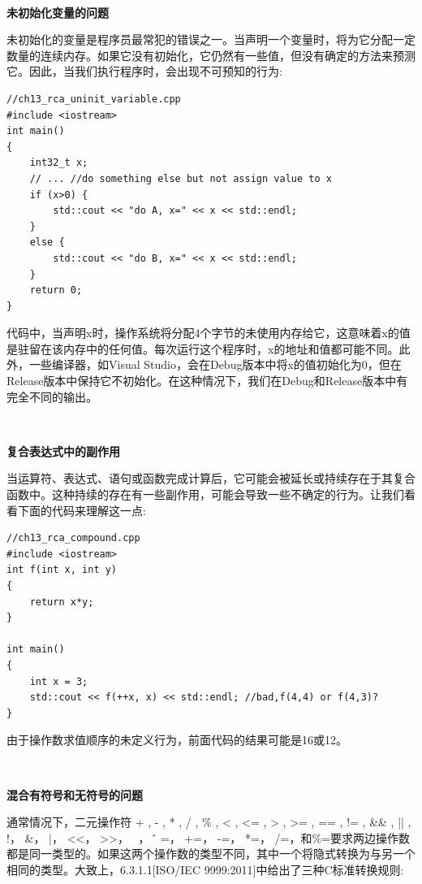 \noindent\textbf{}\ \par
\textbf{未初始化变量的问题} \ \par
未初始化的变量是程序员最常犯的错误之一。当声明一个变量时，将为它分配一定数量的连续内存。如果它没有初始化，它仍然有一些值，但没有确定的方法来预测它。因此，当我们执行程序时，会出现不可预知的行为: \par

\begin{lstlisting}[caption={}]
//ch13_rca_uninit_variable.cpp
#include <iostream>
int main()
{
	int32_t x;
	// ... //do something else but not assign value to x
	if (x>0) {
		std::cout << "do A, x=" << x << std::endl;
	}
	else {
		std::cout << "do B, x=" << x << std::endl;
	}
	return 0;
}
\end{lstlisting}

代码中，当声明x时，操作系统将分配4个字节的未使用内存给它，这意味着x的值是驻留在该内存中的任何值。每次运行这个程序时，x的地址和值都可能不同。此外，一些编译器，如Visual Studio，会在Debug版本中将x的值初始化为0，但在Release版本中保持它不初始化。在这种情况下，我们在Debug和Release版本中有完全不同的输出。 \par

\noindent\textbf{}\ \par
\textbf{复合表达式中的副作用} \ \par
当运算符、表达式、语句或函数完成计算后，它可能会被延长或持续存在于其复合函数中。这种持续的存在有一些副作用，可能会导致一些不确定的行为。让我们看看下面的代码来理解这一点: \par

\begin{lstlisting}[caption={}]
//ch13_rca_compound.cpp
#include <iostream>
int f(int x, int y)
{
	return x*y;
}

int main()
{
	int x = 3;
	std::cout << f(++x, x) << std::endl; //bad,f(4,4) or f(4,3)?
}
\end{lstlisting}

由于操作数求值顺序的未定义行为，前面代码的结果可能是16或12。 \par

\noindent\textbf{}\ \par
\textbf{混合有符号和无符号的问题} \ \par
通常情况下，二元操作符 + , - ,  * ,  / ,  \% ,  < ,  <= , > , >= ,  == ,  != ,  \&\& ,  || ,  !， \&， |， <<， >>， ~， \^， =， +=， -=， *=， /=，和\%=要求两边操作数都是同一类型的。如果这两个操作数的类型不同，其中一个将隐式转换为与另一个相同的类型。大致上，6.3.1.1[ISO/IEC 9999:2011]中给出了三种C标准转换规则:\par

